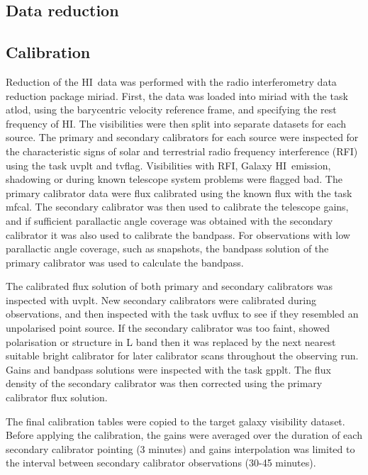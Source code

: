 \documentclass[traditabstract]{aa} %
\newcommand\HI{H{\small I}}
\begin{document}
\begin{appendix} %
\section{Data reduction}

\subsection{Calibration}
\label{sec:cal-HI}

Reduction of the \HI\ data was performed with the radio interferometry
data reduction package {\sc miriad}. First, the data was loaded into
{\sc miriad} with the task {\sc atlod}, using the barycentric velocity
reference frame, and specifying the rest frequency of \HI. The
visibilities were then split into separate datasets for each source.
The primary and secondary calibrators for each source were inspected
for the characteristic signs of solar and terrestrial radio frequency
interference (RFI) using the task {\sc uvplt} and {\sc tvflag}.
Visibilities with RFI, Galaxy \HI\ emission, shadowing or during known
telescope system problems were flagged bad.  The primary calibrator
data were flux calibrated using the known flux with the task {\sc
  mfcal}. The secondary calibrator was then used to calibrate the
telescope gains, and if sufficient parallactic angle coverage was
obtained with the secondary calibrator it was also used to calibrate
the bandpass. For observations with low parallactic angle
coverage, such as snapshots, the bandpass solution of the primary
calibrator was used to calculate the bandpass.


The calibrated flux solution of both primary and secondary calibrators
was inspected with {\sc uvplt}. New secondary calibrators were
calibrated during observations, and then inspected with the
task {\sc uvflux} to see if they resembled an unpolarised point
source. If the secondary calibrator was too faint, showed polarisation
or structure in L band then it was replaced by the next nearest
suitable bright calibrator for later calibrator scans throughout the
observing run.  Gains and bandpass solutions were inspected with the
task {\sc gpplt}. The flux density of the secondary calibrator
was then corrected using the primary calibrator flux solution.

The final calibration tables were copied to the target galaxy
visibility dataset. Before applying the calibration, the gains were
averaged over the duration of each secondary calibrator pointing (3
minutes) and gains interpolation was limited to the interval between
secondary calibrator observations (30-45 minutes).


\end{appendix}
\end{document}
